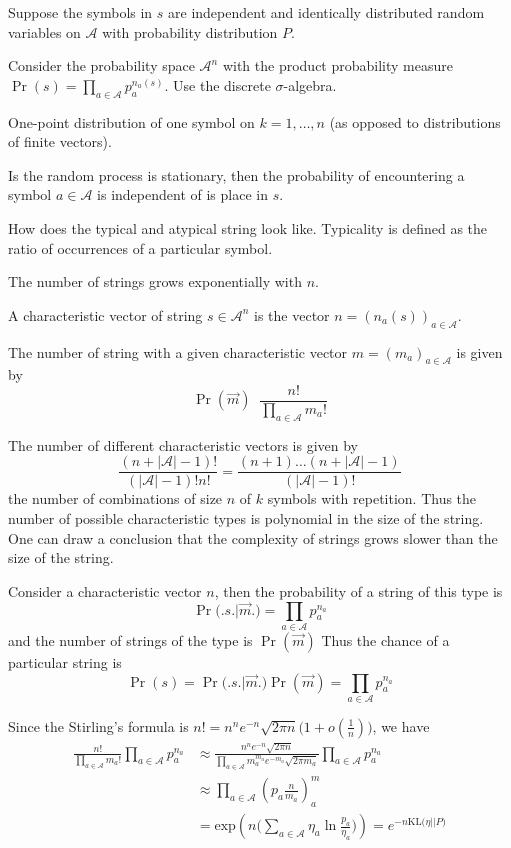 \documentclass[a4paper]{article}
\newcommand{\brac}[1]{{\left ( #1 \right )}}
\newcommand{\abs}[1]{{\left | #1 \right |}}
\newcommand{\Acal}{\mathcal{A}}
\newcommand{\defn}{\mathop{\overset{\Delta}{=}}\nolimits}
\begin{document}
Suppose the symbols in $s$ are independent and identically distributed random variables on $\Acal$ with probability distribution $P$.

Consider the probability space $\Acal^n$ with the product probability measure $\Pr(s) = \prod_{a\in \Acal} p_a^{n_a(s)}$.
Use the discrete $\sigma$-algebra.

One-point distribution of one symbol on $k=1,\ldots,n$ (as opposed to distributions of finite vectors). 

Is the random process is stationary, then the probability of encountering a symbol $a\in \Acal$ is independent of is place in $s$.

How does the typical and atypical string look like. Typicality is defined as the ratio of occurrences of a particular symbol.

The number of strings grows exponentially with $n$.

A characteristic vector of string $s\in\Acal^n$ is the vector $n = \brac{n_a(s)}_{a\in \Acal}$.

The number of string with a given characteristic vector $m = \brac{m_a}_{a\in \Acal}$ is given by 
\[\Pr(\vec{m}) \defn \frac{n!}{\prod_{a\in \Acal} m_a!}\] 

The number of different characteristic vectors is given by 
\[\frac{(n+\abs{\Acal}-1)!}{(\abs{\Acal}-1)!n!} = \frac{(n+1)\ldots (n+\abs{\Acal}-1)}{(\abs{\Acal}-1)!}\]
the number of combinations of size $n$ of $k$ symbols with repetition.
Thus the number of possible characteristic types is polynomial in the size of the string. One can draw a conclusion that the complexity of strings grows slower than the size of the string.

Consider a characteristic vector $n$, then the probability of a string of this type is \[\Pr\Big(\Big. s \big.\big\rvert \vec{m}\Big.\Big) = \prod_{a\in \Acal} p_a^{n_a}\]
and the number of strings of the type is $\Pr(\vec{m})$
Thus the chance of a particular string is
\[\Pr(s) = \Pr\Big(\Big. s \big.\big\rvert \vec{m}\Big.\Big) \Pr(\vec{m}) = \prod_{a\in \Acal} p_a^{n_a}\]

Since the Stirling's formula is $n! = n^n e^{-n} \sqrt{2 \pi n} \big(1+o(\frac{1}{n})\big)$, we have
\begin{align*}
	\frac{n!}{\prod_{a\in \Acal} m_a!} \prod_{a\in \Acal} p_a^{n_a}
	& \approx \frac{n^n e^{-n} \sqrt{2 \pi n} }{\prod_{a\in \Acal} m_a^{m_a} e^{-m_a} \sqrt{2 \pi m_a} } \prod_{a\in \Acal} p_a^{n_a} \\
	& \approx \prod_{a\in \Acal} \brac{p_a \frac{n}{m_a}}^m_a \\
	& = \text{exp}\brac{ n \big( \sum_{a\in \Acal} \eta_a \ln\frac{p_a}{\eta_a} \big) } = e^{-n\text{KL}\big( \eta \lvert \rvert P\big)}
\end{align*}
\end{document}
